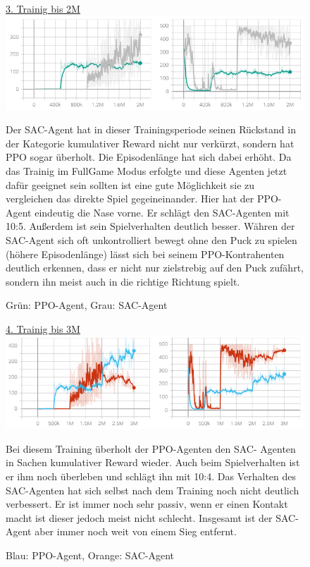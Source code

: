 \begin{figure} [h]
\underline{3. Trainig bis 2M} \\
\includegraphics[width=\textwidth]{images/fullgame_erg}
\caption{Grün: PPO-Agent, Grau: SAC-Agent}
Der SAC-Agent hat in dieser Trainingsperiode seinen Rückstand in der Kategorie kumulativer Reward nicht nur verkürzt, sondern hat PPO sogar überholt. Die Episodenlänge hat sich dabei erhöht. Da das Trainig im FullGame Modus erfolgte und diese Agenten jetzt dafür geeignet sein sollten ist eine gute Möglichkeit sie zu vergleichen das direkte Spiel gegeineinander. Hier hat der PPO-Agent eindeutig die Nase vorne. Er schlägt den SAC-Agenten mit 10:5. Außerdem ist sein Spielverhalten deutlich besser. Währen der SAC-Agent sich oft unkontrolliert bewegt ohne den Puck zu spielen (höhere Episodenlänge) lässt sich bei seinem PPO-Kontrahenten deutlich erkennen, dass er nicht nur zielstrebig auf den Puck zufährt, sondern ihn meist auch in die richtige Richtung spielt. 
\end{figure}

\begin{figure} [h]
\underline{4. Trainig bis 3M} \\
\includegraphics[width=\textwidth]{images/centered_erg}
\caption{Blau: PPO-Agent, Orange: SAC-Agent}
Bei diesem Training überholt der PPO-Agenten den SAC- Agenten in Sachen kumulativer Reward wieder. Auch beim Spielverhalten ist er ihm noch überleben und schlägt ihn mit 10:4. Das Verhalten des SAC-Agenten hat sich selbst nach dem Training noch nicht deutlich verbessert. Er ist immer noch sehr passiv, wenn er einen Kontakt macht ist dieser jedoch meist nicht schlecht. Insgesamt ist der SAC-Agent aber immer noch weit von einem Sieg entfernt.
\end{figure}

